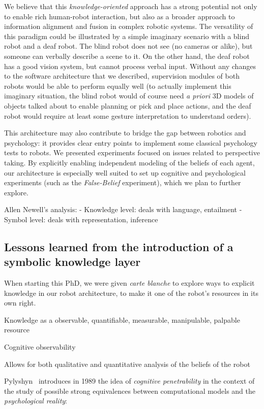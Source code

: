 We believe that this \emph{knowledge-oriented} approach has a strong potential
not only to enable rich human-robot interaction, but also as a broader approach
to information alignment and fusion in complex robotic systems.  The
versatility of this paradigm could be illustrated by a simple imaginary
scenario with a blind robot and a deaf robot. The blind robot does not see (no
cameras or alike), but someone can verbally describe a scene to it. On the
other hand, the deaf robot has a good vision system, but cannot process verbal
input.  Without any changes to the software architecture that we described,
supervision modules of both robots would be able to perform equally well (to
actually implement this imaginary situation, the blind robot would of course
need \textit{a priori} 3D models of objects talked about to enable planning or
pick and place actions, and the deaf robot would require at least some gesture
interpretation to understand orders).

This architecture may also contribute to bridge the gap between robotics and
psychology: it provides clear entry points to implement some classical
psychology tests to robots. We presented experiments focused on issues related
to perspective taking. By explicitly enabling independent modeling of the
beliefs of each agent, our architecture is especially well suited to set up
cognitive and psychological experiments (such as the \emph{False-Belief}
experiment), which we plan to further explore.


Allen Newell's analysis:
- Knowledge level: deals with language, entailment
- Symbol level: deals with representation, inference


\subsection{Lessons learned from the introduction of a symbolic knowledge layer}

When starting this PhD, we were given \emph{carte blanche} to explore ways to
explicit knowledge in our robot architecture, to make it one of the robot's
resources in its own right.


Knowledge as a observable, quantifiable, measurable, manipulable, palpable resource


Cognitive observability

Allows for both qualitative and quantitative analysis of the beliefs of the robot

Pylyshyn~\cite{Pylyshyn1989} introduces in 1989 the idea of \emph{cognitive
penetrability} in the context of the study of possible strong equivalences
between computational models and the \emph{psychological reality}:

